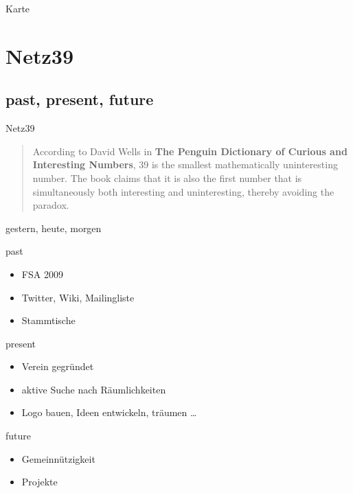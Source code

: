 \documentclass[hyperref={pdfpagelabels=false}]{beamer}
\begin{document}
\begin{frame}[label=secmap]{Karte}
    \begin{figure}
    \end{figure}
\end{frame}

\section{Netz39}

\subsection{past, present, future}

\begin{frame}{Netz39}
    \begin{quote}
        According to David Wells in \textbf{The Penguin Dictionary of Curious and
        Interesting Numbers}, 39 is the smallest mathematically uninteresting
        number. The book claims that it is also the first number that is
        simultaneously both interesting and uninteresting, thereby avoiding the
        paradox. \cite{Wikipedia2010}
    \end{quote}
\end{frame}

\begin{frame}{gestern, heute, morgen}
    \begin{block}{past}
        \begin{itemize}
            \item FSA 2009
            \item Twitter, Wiki, Mailingliste
            \item Stammtische
        \end{itemize}
    \end{block}
    \pause
    \begin{block}{present}
        \begin{itemize}
            \item Verein gegründet
            \item aktive Suche nach Räumlichkeiten
            \item Logo bauen, Ideen entwickeln, träumen \dots
        \end{itemize}
    \end{block}
    \pause
    \begin{block}{future}
        \begin{itemize}
            \item Gemeinnützigkeit
            \item Projekte
        \end{itemize}
    \end{block}
\end{frame}
\end{document}
